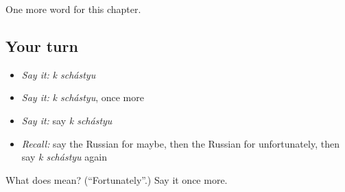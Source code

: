 \begin{grammarlens}[title={What you've built}]
One more word for this chapter.
\end{grammarlens}

\subsection*{Your turn}
\begin{itemize}
\raggedright
  \item \emph{Say it:} \emph{k schástyu}
  \item \emph{Say it:} \emph{k schástyu}, once more
  \item \emph{Say it:} say \emph{k schástyu}
  \item \emph{Recall:} say the Russian for maybe, then the Russian for unfortunately, then say \emph{k schástyu} again
\end{itemize}

\begin{tcolorbox}[breakable,colback=teal!4,colframe=teal!35!black,title={Before you move on}]
What does   mean? (\textquotedblleft{}Fortunately\textquotedblright{}.) Say it once more.
\end{tcolorbox}
